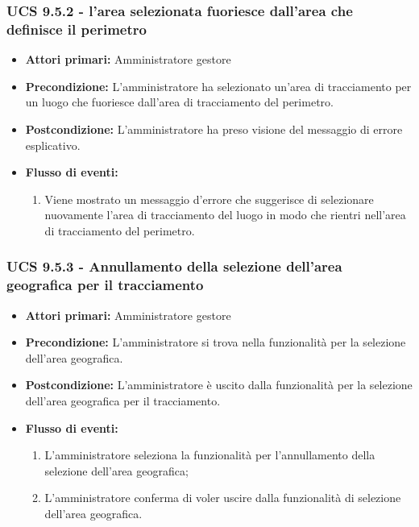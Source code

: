 \subsubsection{UCS 9.5.2 - l'area selezionata fuoriesce dall'area che definisce il perimetro}%
\begin{itemize}
\item \textbf{Attori primari:} Amministratore gestore
\item \textbf{Precondizione:} L'amministratore ha selezionato un'area di tracciamento per un luogo che fuoriesce dall'area di tracciamento del perimetro.
\item \textbf{Postcondizione:} L'amministratore ha preso visione del messaggio di errore esplicativo.
\item \textbf{Flusso di eventi:}
    \begin{enumerate}
    \item Viene mostrato un messaggio d'errore che suggerisce di selezionare nuovamente l'area di tracciamento del luogo in modo che rientri nell'area di tracciamento del perimetro.
    \end{enumerate} 
\end{itemize}

\subsubsection{UCS 9.5.3 - Annullamento della selezione dell'area geografica per il tracciamento}%
\begin{itemize}
\item \textbf{Attori primari:} Amministratore gestore
\item \textbf{Precondizione:} L'amministratore si trova nella funzionalità per la selezione dell'area geografica.
\item \textbf{Postcondizione:} L'amministratore è uscito dalla funzionalità per la selezione dell'area geografica per il tracciamento.
\item \textbf{Flusso di eventi:}
    \begin{enumerate}
    \item L'amministratore seleziona la funzionalità per l'annullamento della selezione dell'area geografica;
    \item L'amministratore conferma di voler uscire dalla funzionalità di selezione dell'area geografica.
    \end{enumerate} 
\end{itemize}

